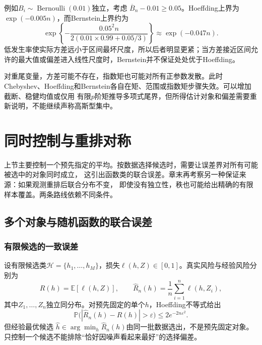 例如\(B_i\sim\operatorname{Bernoulli}(0.01)\)独立，考虑
\(\overline{B}_n-0.01\geq0.05\)。Hoeffding上界为
\(\exp(-0.005n)\)，而Bernstein上界约为
\[
  \exp\left\{
    -\frac{0.05^2n}
      {2(0.01\times0.99+0.05/3)}
  \right\}
  \approx \exp(-0.047n).
\]
低发生率使实际方差远小于区间最坏尺度，所以后者明显更紧；当方差接近区间允许的最大值或偏差进入线性尺度时，Bernstein并不保证处处优于Hoeffding。

对重尾变量，方差可能不存在，指数矩也可能对所有正参数发散。此时Chebyshev、Hoeffding和Bernstein各自在矩、范围或指数矩步骤失效。可以增加截断、稳健均值或仅用
有限\(p\)阶矩推导多项式尾界，但所得估计对象和偏差需要重新说明，不能继续声称高斯型集中。

\section{同时控制与重排对称}
\label{sec:probability-uniform-errors-symmetry}

上节主要控制一个预先指定的平均。按数据选择候选时，需要让误差界对所有可能被选中的对象同时成立，
这引出函数类的联合误差。章末再考察另一种保证来源：如果观测重排后联合分布不变，
即使没有独立性，秩也可能给出精确的有限样本覆盖。两条路线依赖不同条件。

\subsection{多个对象与随机函数的联合误差}
\label{sec:probability-random-functions-uniform-error}

\subsubsection{有限候选的一致误差}

设有限候选类\(\mathcal{H}=\{h_1,\ldots,h_M\}\)，损失\(\ell(h,Z)\in[0,1]\)。真实风险与经验风险分别为
\[ R(h)=\mathbb{E}[\ell(h,Z)],
  \qquad\widehat{R}_n(h)=\frac{1}{n}\sum_{i=1}^{n}\ell(h,Z_i), \]
其中\(Z_1,\ldots,Z_n\)独立同分布。对预先固定的单个\(h\)，Hoeffding不等式给出
\[ \mathbb{P}\bigl(
    |\widehat{R}_n(h)-R(h)|>\varepsilon\bigr)\leq 2e^{-2n\varepsilon^2}. \]
但经验最优候选
\(\widehat{h}\in\arg\min_h\widehat{R}_n(h)\)由同一批数据选出，不是预先固定对象。只控制一个候选不能排除“恰好因噪声看起来最好”的选择偏差。

